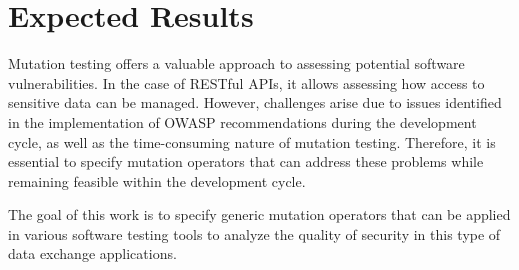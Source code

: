 \chapter{Expected Results}

Mutation testing offers a valuable approach to assessing potential software vulnerabilities. In the case of RESTful APIs, it allows assessing how access to sensitive data can be managed. However, challenges arise due to issues identified in the implementation of OWASP recommendations during the development cycle, as well as the time-consuming nature of mutation testing. Therefore, it is essential to specify mutation operators that can address these problems while remaining feasible within the development cycle.

The goal of this work is to specify generic mutation operators that can be applied in various software testing tools to analyze the quality of security in this type of data exchange applications.


